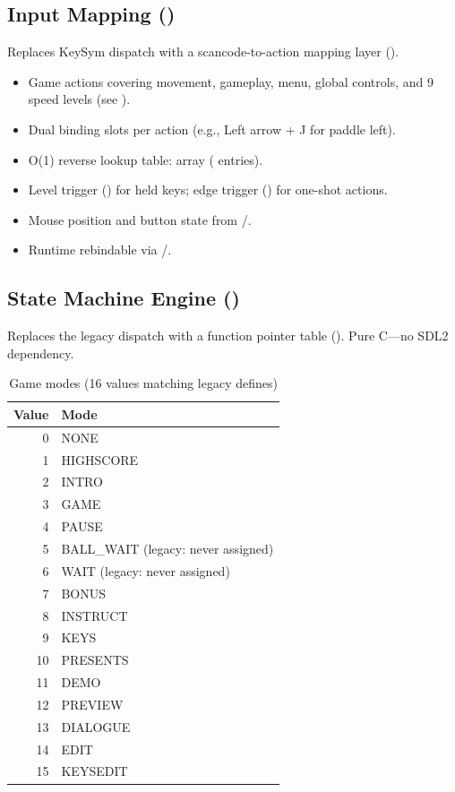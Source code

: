 \documentclass[11pt,a4paper]{article}
\begin{document}
\subsection{Input Mapping ()}
\label{sec:input}

Replaces  KeySym dispatch with a scancode-to-action mapping layer ().

\begin{itemize}[nosep]
    \item Game actions covering movement, gameplay, menu, global controls, and 9 speed levels (see ).
    \item Dual binding slots per action (e.g., Left arrow + J for paddle left).
    \item O(1) reverse lookup table:  array ( entries).
    \item Level trigger () for held keys; edge trigger () for one-shot actions.
    \item Mouse position and button state from /.
    \item Runtime rebindable via /.
\end{itemize}

\subsection{State Machine Engine ()}
\label{sec:state-machine}

Replaces the legacy  dispatch with a function pointer table (). Pure C---no SDL2 dependency.

\begin{table}[h]
\centering
\caption{Game modes (16 values matching legacy  defines)}
\label{tab:modes}
\begin{tabular}{rl}
\toprule
\textbf{Value} & \textbf{Mode} \\
\midrule
0 & NONE \\
1 & HIGHSCORE \\
2 & INTRO \\
3 & GAME \\
4 & PAUSE \\
5 & BALL\_WAIT (legacy: never assigned) \\
6 & WAIT (legacy: never assigned) \\
7 & BONUS \\
8 & INSTRUCT \\
9 & KEYS \\
10 & PRESENTS \\
11 & DEMO \\
12 & PREVIEW \\
13 & DIALOGUE \\
14 & EDIT \\
15 & KEYSEDIT \\
\bottomrule
\end{tabular}
\end{table}
\end{document}

